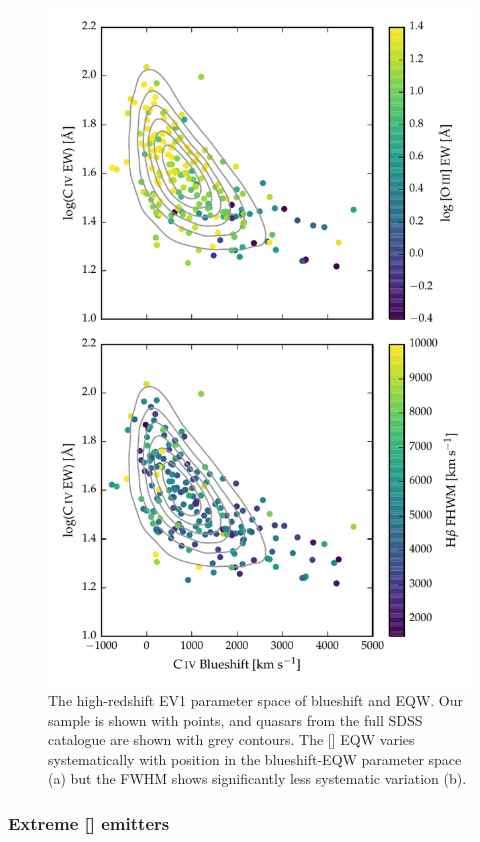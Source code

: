 \begin{figure}
    \includegraphics[width=\columnwidth]{figures/chapter04/ev1.pdf} 
    \caption[{The high-redshift EV1 parameter space of  blueshift and EQW.}]{The high-redshift EV1 parameter space of  blueshift and EQW. Our sample is shown with points, and quasars from the full SDSS catalogue are shown with grey contours. The [] EQW varies systematically with position in the  blueshift-EQW parameter space (a) but the \hb FWHM shows significantly less systematic variation (b).}      
    \label{fig:ev1}
\end{figure}

\subsubsection{Extreme [] emitters}

